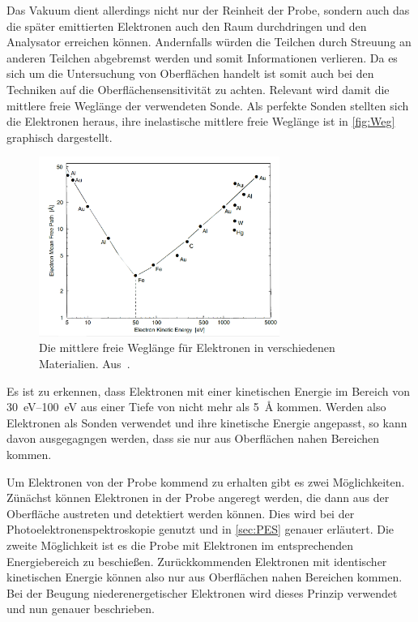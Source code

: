        Das Vakuum dient allerdings nicht nur der Reinheit der Probe, sondern auch das die später emittierten Elektronen auch den Raum durchdringen und den Analysator erreichen können.
        Andernfalls würden die Teilchen durch Streuung an anderen Teilchen abgebremst werden und somit Informationen verlieren.
        Da es sich um die Untersuchung von Oberflächen handelt ist somit auch bei den Techniken auf die Oberflächensensitivität zu achten.
        Relevant wird damit die mittlere freie Weglänge der verwendeten Sonde.
        Als perfekte Sonden stellten sich die Elektronen heraus, ihre inelastische mittlere freie Weglänge ist in \autoref{fig:Weg} graphisch dargestellt.
        \begin{figure}
            \centering
            \includegraphics[width=0.7\textwidth]{Weg}
            \caption{Die mittlere freie Weglänge für Elektronen in verschiedenen Materialien. Aus~\cite{Hüfner}.}
            \label{fig:Weg}
        \end{figure}
        Es ist zu erkennen, dass Elektronen mit einer kinetischen Energie im Bereich von \SIrange{30}{100}{\electronvolt} aus einer Tiefe von nicht mehr als \SI{5}{\angstrom} kommen.
        Werden also Elektronen als Sonden verwendet und ihre kinetische Energie angepasst, so kann davon ausgegagngen werden, dass sie nur aus Oberflächen nahen Bereichen kommen.

        Um Elektronen von der Probe kommend zu erhalten gibt es zwei Möglichkeiten.
        Zünächst können Elektronen in der Probe angeregt werden, die dann aus der Oberfläche austreten und detektiert werden können.
        Dies wird bei der Photoelektronenspektroskopie genutzt und in \autoref{sec:PES} genauer erläutert.
        Die zweite Möglichkeit ist es die Probe mit Elektronen im entsprechenden Energiebereich zu beschießen.
        Zurückkommenden Elektronen mit identischer kinetischen Energie können also nur aus Oberflächen nahen Bereichen kommen.
        Bei der Beugung niederenergetischer Elektronen wird dieses Prinzip verwendet und nun genauer beschrieben.

